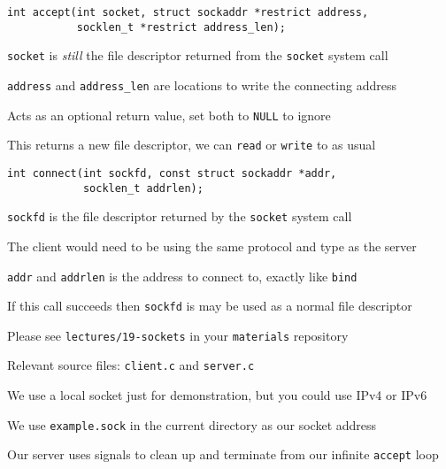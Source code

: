   \begin{slide}
    

    \begin{verbatim}
int accept(int socket, struct sockaddr *restrict address,
           socklen_t *restrict address_len);
    \end{verbatim}
    \medskip

    \texttt{socket} is \textit{still} the file descriptor returned from the
    \texttt{socket} system call
    \medskip

    \texttt{address} and \texttt{address\_len} are locations to write the
    connecting address

    \leftspace{}Acts as an optional return value, set both to \texttt{NULL} to
                 ignore
    \medskip

    This returns a new file descriptor, we can \texttt{read} or \texttt{write}
    to as usual

  \end{slide}

  \begin{slide}
    

    \begin{verbatim}
int connect(int sockfd, const struct sockaddr *addr,
            socklen_t addrlen);
    \end{verbatim}
    \medskip

    \texttt{sockfd} is the file descriptor returned by the \texttt{socket}
    system call

    \leftspace{}The client would need to be using the same protocol and type
    as the server
    \medskip

    \texttt{addr} and \texttt{addrlen} is the address to connect to, exactly
    like \texttt{bind}
    \medskip

    If this call succeeds then \texttt{sockfd} is may be used as a normal
    file descriptor

  \end{slide}

  \begin{slide}
    

    Please see \texttt{lectures/19-sockets} in your \texttt{materials}
    repository

    \leftspace{}Relevant source files: \texttt{client.c} and \texttt{server.c}
    \medskip

    We use a local socket just for demonstration, but you could use IPv4 or IPv6

    \leftspace{}We use \texttt{example.sock} in the current directory as our
                 socket address
    \medskip

    Our server uses signals to clean up and terminate from our infinite
    \texttt{accept} loop

  \end{slide}

